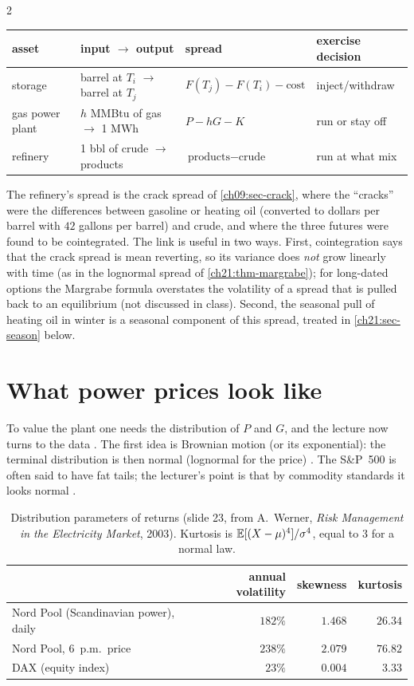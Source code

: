 \begin{paracol}{2}
\begin{center}
\begin{tabular}{@{}l l l l@{}}
\toprule
asset & input $\to$ output & spread & exercise decision\\
\midrule
storage & barrel at $T_i$ $\to$ barrel at $T_j$ & $F(T_j)-F(T_i)-\text{cost}$ & inject/withdraw\\
gas power plant & $h$ MMBtu of gas $\to$ 1 MWh & $P-hG-K$ & run or stay off\\
refinery & 1 bbl of crude $\to$ products & $\text{products}-\text{crude}$ & run at what mix\\
\bottomrule
\end{tabular}
\end{center}
The refinery's spread is the crack spread of \cref{ch09:sec-crack}, where the ``cracks'' were the differences between gasoline or heating oil (converted to dollars per barrel with $42$ gallons per barrel) and crude, and where the three futures were found to be cointegrated. The link is useful in
two ways. First, cointegration says that the crack spread is mean reverting, so its variance does \emph{not} grow linearly with time (as in the lognormal spread of \cref{ch21:thm-margrabe}); for long-dated options the Margrabe formula overstates the volatility of a spread that is pulled back to an equilibrium
(not discussed in class). Second, the seasonal pull of heating oil in winter is a seasonal component of this spread, treated in \cref{ch21:sec-season} below.

\section{What power prices look like}\label{ch21:sec-stats}

To value the plant one needs the distribution of $P$ and $G$, and the lecture now turns to the data . The first idea is Brownian motion (or its exponential): the terminal distribution is then normal
(lognormal for the price) . The S\&P~500 is often said to have fat tails; the lecturer's point is that by commodity standards it looks normal .

\begin{table}[ht]
\centering
\begin{tabular}{@{}l r r r@{}}
\toprule
 & annual volatility & skewness & kurtosis\\
\midrule
Nord Pool (Scandinavian power), daily & $182\%$ & $1.468$ & $26.34$\\
Nord Pool, 6~p.m.\ price & $238\%$ & $2.079$ & $76.82$\\
DAX (equity index) & $23\%$ & $0.004$ & $3.33$\\
\bottomrule
\end{tabular}
\caption{Distribution parameters of returns (slide 23, from A.~Werner, \emph{Risk Management in the Electricity Market}, 2003). Kurtosis is $\mathbb{E}[(X-\mu)^4]/\sigma^4$, equal to $3$ for a normal law.}\label{ch21:tab-kurt}
\end{table}


\end{paracol}
